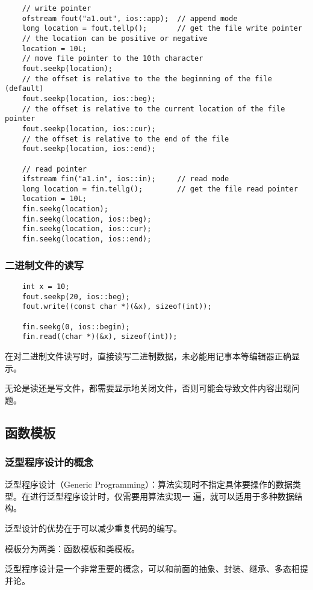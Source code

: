 \documentclass[UTF8]{ctexart}
\begin{document}
\begin{verbatim}
    // write pointer
    ofstream fout("a1.out", ios::app);  // append mode
    long location = fout.tellp();       // get the file write pointer
    // the location can be positive or negative
    location = 10L;
    // move file pointer to the 10th character
    fout.seekp(location);
    // the offset is relative to the the beginning of the file (default)
    fout.seekp(location, ios::beg);
    // the offset is relative to the current location of the file pointer
    fout.seekp(location, ios::cur);
    // the offset is relative to the end of the file
    fout.seekp(location, ios::end);

    // read pointer
    ifstream fin("a1.in", ios::in);     // read mode
    long location = fin.tellg();        // get the file read pointer
    location = 10L;
    fin.seekg(location);
    fin.seekg(location, ios::beg);
    fin.seekg(location, ios::cur);
    fin.seekg(location, ios::end);
\end{verbatim}

\subsubsection{二进制文件的读写}
\begin{verbatim}
    int x = 10;
    fout.seekp(20, ios::beg);
    fout.write((const char *)(&x), sizeof(int));

    fin.seekg(0, ios::begin);
    fin.read((char *)(&x), sizeof(int));
\end{verbatim}

在对二进制文件读写时，直接读写二进制数据，未必能用记事本等编辑器正确显示。

无论是读还是写文件，都需要显示地关闭文件，否则可能会导致文件内容出现问题。

\subsection{函数模板}
\subsubsection{泛型程序设计的概念}
泛型程序设计（Generic Programming）：算法实现时不指定具体要操作的数据类型。在进行泛型程序设计时，仅需要用算法实现一
遍，就可以适用于多种数据结构。

泛型设计的优势在于可以减少重复代码的编写。

模板分为两类：函数模板和类模板。

泛型程序设计是一个非常重要的概念，可以和前面的抽象、封装、继承、多态相提并论。
\end{document}
